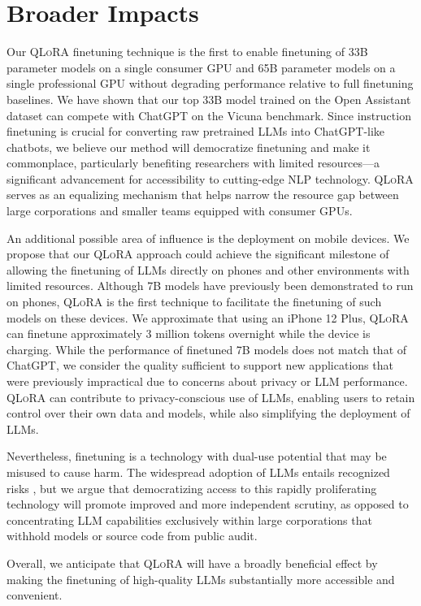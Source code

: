 \section{Broader Impacts}

Our \textsc{QLoRA} finetuning technique is the first to enable finetuning of 33B parameter models on a single consumer GPU and 65B parameter models on a single professional GPU without degrading performance relative to full finetuning baselines. We have shown that our top 33B model trained on the Open Assistant dataset can compete with ChatGPT on the Vicuna benchmark. Since instruction finetuning is crucial for converting raw pretrained LLMs into ChatGPT-like chatbots, we believe our method will democratize finetuning and make it commonplace, particularly benefiting researchers with limited resources—a significant advancement for accessibility to cutting-edge NLP technology. \textsc{QLoRA} serves as an equalizing mechanism that helps narrow the resource gap between large corporations and smaller teams equipped with consumer GPUs.

An additional possible area of influence is the deployment on mobile devices. We propose that our \textsc{QLoRA} approach could achieve the significant milestone of allowing the finetuning of LLMs directly on phones and other environments with limited resources. Although 7B models have previously been demonstrated to run on phones, \textsc{QLoRA} is the first technique to facilitate the finetuning of such models on these devices. We approximate that using an iPhone 12 Plus, \textsc{QLoRA} can finetune approximately 3 million tokens overnight while the device is charging. While the performance of finetuned 7B models does not match that of ChatGPT, we consider the quality sufficient to support new applications that were previously impractical due to concerns about privacy or LLM performance. \textsc{QLoRA} can contribute to privacy-conscious use of LLMs, enabling users to retain control over their own data and models, while also simplifying the deployment of LLMs.

Nevertheless, finetuning is a technology with dual-use potential that may be misused to cause harm. The widespread adoption of LLMs entails recognized risks \citep{bommasani2021opportunities,bender2021dangers}, but we argue that democratizing access to this rapidly proliferating technology will promote improved and more independent scrutiny, as opposed to concentrating LLM capabilities exclusively within large corporations that withhold models or source code from public audit.

Overall, we anticipate that \textsc{QLoRA} will have a broadly beneficial effect by making the finetuning of high-quality LLMs substantially more accessible and convenient.


